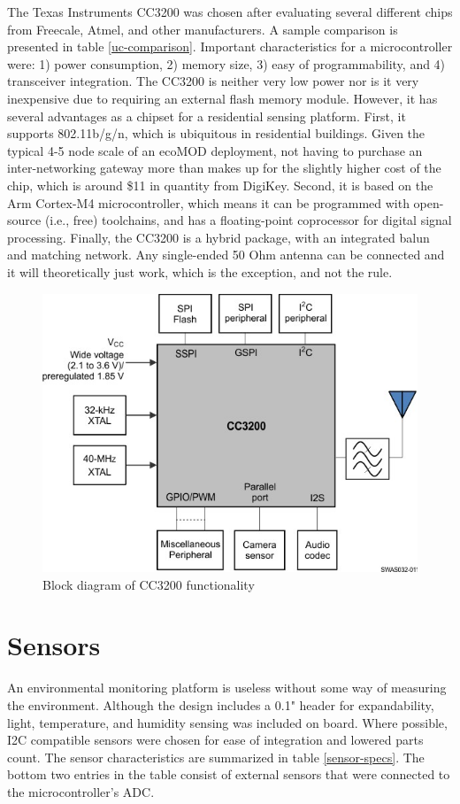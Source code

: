 The Texas Instruments CC3200 was chosen after evaluating several different chips from Freecale, Atmel, and other manufacturers. A sample comparison is presented in table \ref{uc-comparison}. Important characteristics for a microcontroller were: 1) power consumption, 2) memory size, 3) easy of programmability, and 4) transceiver integration. The CC3200 is neither very low power nor is it very inexpensive due to requiring an external flash memory module. However, it has several advantages as a chipset for a residential sensing platform. First, it supports 802.11b/g/n, which is ubiquitous in residential buildings. Given the typical 4-5 node scale of an ecoMOD deployment, not having to purchase an inter-networking gateway more than makes up for the slightly higher cost of the chip, which is around \$11 in quantity from DigiKey. Second, it is based on the Arm Cortex-M4 microcontroller, which means it can be programmed with open-source (i.e., free) toolchains, and has a floating-point coprocessor for digital signal processing. Finally, the CC3200 is a hybrid package, with an integrated balun and matching network. Any single-ended 50 Ohm antenna can be connected and it will theoretically just work, which is the exception, and not the rule.

\begin{figure}[h]
\centering
\includegraphics[width=0.5\linewidth]{images/cc3200-block}
\caption[CC3200 Block Diagram]{Block diagram of CC3200 functionality\cite{2015}}
\label{fig:cc3200-block}
\end{figure}

\section{Sensors}

An environmental monitoring platform is useless without some way of measuring the environment. Although the design includes a 0.1" header for expandability, light, temperature, and humidity sensing was included on board. Where possible, I2C compatible sensors were chosen for ease of integration and lowered parts count. The sensor characteristics are summarized in table \ref{sensor-specs}. The bottom two entries in the table consist of external sensors that were connected to the microcontroller's ADC. 

